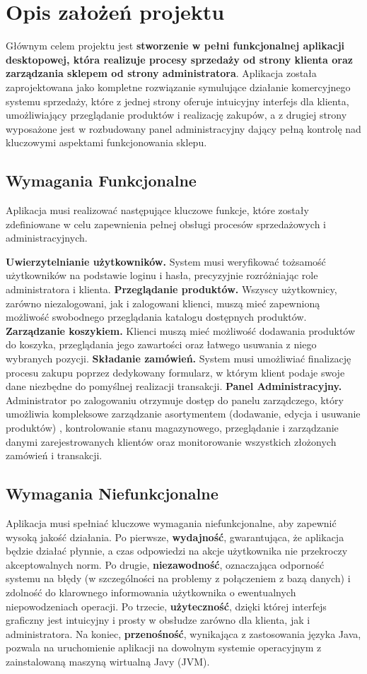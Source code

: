 
\chapter{Opis założeń projektu}
\label{chap:zalozenia}

Głównym celem projektu jest \textbf{stworzenie w pełni funkcjonalnej aplikacji desktopowej, która realizuje procesy sprzedaży od strony klienta oraz zarządzania sklepem od strony administratora}. Aplikacja została zaprojektowana jako kompletne rozwiązanie symulujące działanie komercyjnego systemu sprzedaży, które z jednej strony oferuje intuicyjny interfejs dla klienta, umożliwiający przeglądanie produktów i realizację zakupów, a z drugiej strony wyposażone jest w rozbudowany panel administracyjny dający pełną kontrolę nad kluczowymi aspektami funkcjonowania sklepu.

\section{Wymagania Funkcjonalne}
Aplikacja musi realizować następujące kluczowe funkcje, które zostały zdefiniowane w celu zapewnienia pełnej obsługi procesów sprzedażowych i administracyjnych.

\textbf{Uwierzytelnianie użytkowników.} System musi weryfikować tożsamość użytkowników na podstawie loginu i hasła, precyzyjnie rozróżniając role administratora i klienta. 
\textbf{Przeglądanie produktów.} Wszyscy użytkownicy, zarówno niezalogowani, jak i zalogowani klienci, muszą mieć zapewnioną możliwość swobodnego przeglądania katalogu dostępnych produktów. 
\textbf{Zarządzanie koszykiem.} Klienci muszą mieć możliwość dodawania produktów do koszyka, przeglądania jego zawartości oraz łatwego usuwania z niego wybranych pozycji. 
\textbf{Składanie zamówień.} System musi umożliwiać finalizację procesu zakupu poprzez dedykowany formularz, w którym klient podaje swoje dane niezbędne do pomyślnej realizacji transakcji. 
\textbf{Panel Administracyjny.} Administrator po zalogowaniu otrzymuje dostęp do panelu zarządczego, który umożliwia kompleksowe zarządzanie asortymentem (dodawanie, edycja i usuwanie produktów) , kontrolowanie stanu magazynowego, przeglądanie i zarządzanie danymi zarejestrowanych klientów oraz monitorowanie wszystkich złożonych zamówień i transakcji. 
\section{Wymagania Niefunkcjonalne}
Aplikacja musi spełniać kluczowe wymagania niefunkcjonalne, aby zapewnić wysoką jakość działania. Po pierwsze, \textbf{wydajność}, gwarantująca, że aplikacja będzie działać płynnie, a czas odpowiedzi na akcje użytkownika nie przekroczy akceptowalnych norm. Po drugie, \textbf{niezawodność}, oznaczająca odporność systemu na błędy (w szczególności na problemy z połączeniem z bazą danych) i zdolność do klarownego informowania użytkownika o ewentualnych niepowodzeniach operacji. Po trzecie, \textbf{użyteczność}, dzięki której interfejs graficzny jest intuicyjny i prosty w obsłudze zarówno dla klienta, jak i administratora. Na koniec, \textbf{przenośność}, wynikająca z zastosowania języka Java, pozwala na uruchomienie aplikacji na dowolnym systemie operacyjnym z zainstalowaną maszyną wirtualną Javy (JVM).
